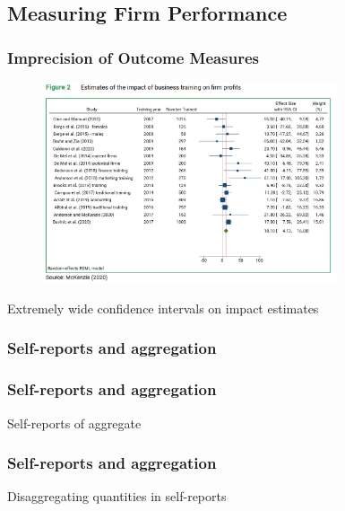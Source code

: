 \documentclass[hideothersubsections, usenames,dvipsnames,11pt]{beamer}
\newenvironment{itemize_2pt}{\itemize\addtolength{\itemsep}{2pt}}{\enditemize}
\begin{document}
\subsection{Measuring Firm Performance}

\begin{frame}
\frametitle{Imprecision of Outcome Measures}
	
	\begin{figure}[htbp]
		\centering
		\includegraphics[width=23.5em]{pics/McK2020_profits.png}
		\label{McKenzie(2020): Profits2}
	\end{figure}	
	
\vspace{-1em}	
	
	\begin{itemize_2pt}
		\item \textcolor{bdf}{Extremely wide confidence intervals} on impact estimates
	\end{itemize_2pt}
\end{frame}

\begin{frame}
\frametitle{Self-reports and aggregation}

\citep{Garlick2019}
\citep{deMel2009}
\citep{Bernhardt2019}

\end{frame}

\begin{frame}
\frametitle{Self-reports and aggregation}
	\begin{itemize_2pt}
	\item Self-reports of aggregate \citep{deMel2009}
	\vspace{0.1in}
	\end{itemize_2pt}
\end{frame}

\begin{frame}
\frametitle{Self-reports and aggregation}
	\begin{itemize_2pt}
	\item Disaggregating quantities in self-reports \citep{deMel2009}
	\vspace{0.1in}
	\end{itemize_2pt}
\end{frame}
\end{document}
